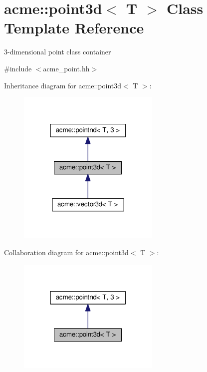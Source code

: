 \hypertarget{classacme_1_1point3d}{}\section{acme\+:\+:point3d$<$ T $>$ Class Template Reference}
\label{classacme_1_1point3d}


3-\/dimensional point class container  




{\ttfamily \#include $<$acme\+\_\+point.\+hh$>$}



Inheritance diagram for acme\+:\+:point3d$<$ T $>$\+:
\nopagebreak
\begin{figure}[H]
\begin{center}
\leavevmode
\includegraphics[width=193pt]{dc/d40/classacme_1_1point3d__inherit__graph}
\end{center}
\end{figure}


Collaboration diagram for acme\+:\+:point3d$<$ T $>$\+:
\nopagebreak
\begin{figure}[H]
\begin{center}
\leavevmode
\includegraphics[width=193pt]{d9/d61/classacme_1_1point3d__coll__graph}
\end{center}
\end{figure}
